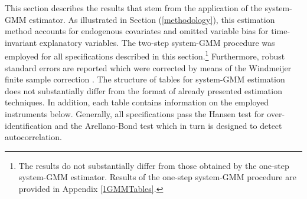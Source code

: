 \documentclass[12pt, a4paper]{article}
\begin{document}
This section describes the results that stem from the application of the system-GMM estimator. As illustrated in Section (\ref{methodology}), this estimation method accounts for endogenous covariates and omitted variable bias for time-invariant explanatory variables. The two-step system-GMM procedure was employed for all specifications described in this section.\footnote{The results do not substantially differ from those obtained by the one-step system-GMM estimator. Results of the one-step system-GMM procedure are provided in Appendix \ref{1GMMTables}.} Furthermore, robust standard errors are reported which were corrected by means of the Windmeijer finite sample correction \cite{windmeijer2005}. The structure of tables for system-GMM estimation does not substantially differ from the format of already presented estimation techniques. In addition, each table contains information on the employed instruments below. Generally, all specifications pass the Hansen test for over-identification and the Arellano-Bond test which in turn is designed to detect autocorrelation.
\end{document}
